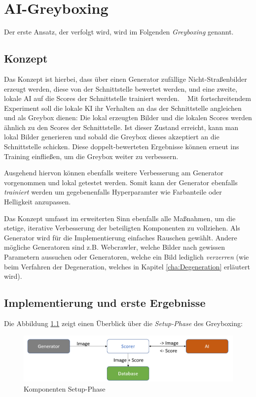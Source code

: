 \chapter{AI-Greyboxing}
\label{cha:GreyBoxing}
Der erste Ansatz, der verfolgt wird, wird im Folgenden \textit{Greyboxing} genannt.
\section{Konzept}
\label{sec:KonzeptGreyBoxing}
Das Konzept ist hierbei, dass über einen Generator zufällige Nicht-Straßenbilder erzeugt werden, diese von der Schnittstelle bewertet werden, und eine zweite, lokale AI auf die Scores der Schnittstelle trainiert werden. 
~\newline
Mit fortschreitendem Experiment soll die lokale \ac{KI} ihr Verhalten an das der Schnittstelle angleichen und als Greybox dienen: 
Die lokal erzeugten Bilder und die lokalen Scores werden ähnlich zu den Scores der Schnittstelle. 
Ist dieser Zustand erreicht, kann man lokal Bilder generieren und sobald die Greybox dieses akzeptiert an die Schnittstelle schicken. 
Diese doppelt-bewerteten Ergebnisse können erneut ins Training einfließen, um die Greybox weiter zu verbessern. 

Ausgehend hiervon können ebenfalls weitere Verbesserung am Generator vorgenommen und lokal getestet werden.
Somit kann der Generator ebenfalls \textit{trainiert} werden um gegebenenfalls Hyperparamter wie Farbanteile oder Helligkeit anzupassen. 

Das Konzept umfasst im erweiterten Sinn ebenfalls alle Maßnahmen, um die stetige, iterative Verbesserung der beteiligten Komponenten zu vollziehen. 
Als Generator wird für die Implementierung einfaches Rauschen gewählt. 
Andere mögliche Generatoren sind z.B. Webcrawler, welche Bilder nach gewissen Parametern aussuchen oder Generatoren, welche ein Bild lediglich \textit{verzerren} (wie beim Verfahren der Degeneration, welches in Kapitel \ref{cha:Degeneration} erläutert wird).
\newpage
\section{Implementierung und erste Ergebnisse}\label{sec:ImplementierungGreyBoxing}

Die Abbildung \ref{fig:greyboxingstart} zeigt einen Überblick über die \textit{Setup-Phase} des Greyboxing:

\begin{figure}[h]
	\centering
	\includegraphics[width=0.9\linewidth]{Images/GreyBoxingStart}
	\caption[Komponenten Setup-Phase]{Komponenten Setup-Phase}
	\label{fig:greyboxingstart}
\end{figure}

